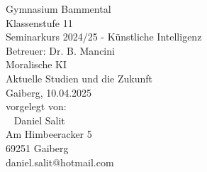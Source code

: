\documentclass[12pt]{extarticle}
\begin{document}
    \begin{titlepage}
        \begin{center}
            \vspace{3 cm}
            \large
            Gymnasium Bammental \\
            Klassenstufe 11 \\
            Seminarkurs 2024/25 - Künstliche Intelligenz \\
            Betreuer: Dr. B. Mancini \\
            \vfill
            \Huge Moralische KI \\
            \huge Aktuelle Studien und die Zukunft \\
            \vspace{5 cm}
            \large
            Gaiberg, 10.04.2025 \\
            \vspace{2 cm}
            vorgelegt von: \\
            ~\newline
            Daniel Salit \\
            Am Himbeeracker 5 \\
            69251 Gaiberg \\
            daniel.salit@hotmail.com \\
        \end{center}
        \normalsize
    \end{titlepage}


    \tableofcontents

    \clearpage

    

    \clearpage
    
    
    

    

    \clearpage
    
\end{document}
